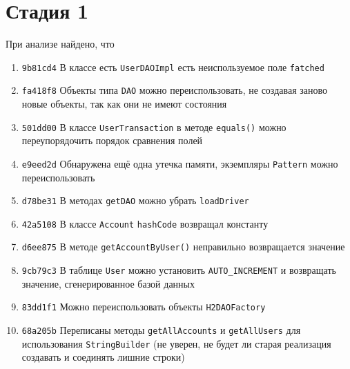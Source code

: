 \documentclass{article}
\begin{document}
	\section*{Стадия 1}
		При анализе найдено, что
	\begin{enumerate}
		\item \texttt{9b81cd4} В классе есть \texttt{UserDAOImpl} есть неиспользуемое поле \texttt{fatched} 
		\item \texttt{fa418f8} Объекты типа \texttt{DAO} можно переиспользовать, не создавая заново новые объекты, так как они не имеют состояния 
		\item \texttt{501dd00} В классе \texttt{UserTransaction} в методе \texttt{equals()} можно переупорядочить порядок сравнения полей
		\item \texttt{e9eed2d} Обнаружена ещё одна утечка памяти, экземпляры \texttt{Pattern} можно переиспользовать
		\item \texttt{d78be31} В методах \texttt{getDAO} можно убрать \texttt{loadDriver}
		\item \texttt{42a5108} В классе \texttt{Account} \texttt{hashCode} возвращал константу
		\item \texttt{d6ee875} В методе \texttt{getAccountByUser()} неправильно возвращается значение
		\item \texttt{9cb79c3} В таблице \texttt{User} можно установить \texttt{AUTO\_INCREMENT} и возвращать значение, сгенерированное базой данных
		\item \texttt{83dd1f1} Можно переиспользовать объекты \texttt{H2DAOFactory}
		\item \texttt{68a205b} Переписаны методы \texttt{getAllAccounts} и \texttt{getAllUsers} для использования \texttt{StringBuilder} (не уверен, не будет ли старая реализация создавать и соединять лишние строки)
	\end{enumerate}		


	\newpage
\end{document}
